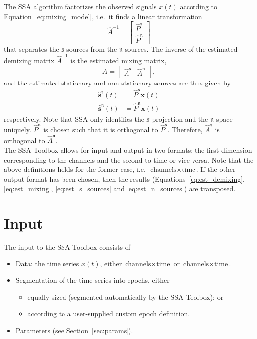 \documentclass{article}
\newcommand{\1}{\ensuremath{\mathds{1}}}
\newcommand{\s}{\ensuremath{\mathfrak{s}}}
\newcommand{\n}{\ensuremath{\mathfrak{n}}}
\newcommand{\0}{\ensuremath{0}}
\begin{document}
The SSA algorithm factorizes the observed signals $x(t)$ according to
Equation~\ref{eq:mixing_model}, i.e.~it finds a linear transformation
\begin{equation}
\label{eq:est_demixing}
  \hat{A}^{-1} = \begin{bmatrix} \hat{P}^{\s} \\ \hat{P}^{\n} \end{bmatrix}
\end{equation}
that separates the \s-sources from the \n-sources. The inverse of the estimated 
demixing matrix $\hat{A}^{-1}$ is the estimated mixing matrix, 
\begin{equation}
\label{eq:est_mixing}
 \hat{A} = \begin{bmatrix} \hat{A}^{\s} & \hat{A}^{\n} \end{bmatrix}, 
\end{equation}
and the estimated stationary and non-stationary sources are thus given by
\begin{align}
\label{eq:est_s_sources}
  \hat{\mathbf s}^{\s}(t) & = \hat{P}^{\s} {\mathbf x}(t) \\
\label{eq:est_n_sources}
  \hat{\mathbf s}^{\n}(t) & = \hat{P}^{\n} {\mathbf x}(t) 
\end{align}
respectively.
Note that SSA only identifies the $\s$-projection and the $\n$-space uniquely.
$\hat P^{\n}$ is chosen such that it is orthogonal to $\hat P^{\s}$.
Therefore, $\hat A^{\s}$ is orthogonal to $\hat A^{\n}$.\\
The SSA Toolbox allows for input and output in two formats: the first
dimension corresponding to the channels and the second to time or vice versa.  
Note that the above definitions holds for the former case, 
i.e.~$\text{channels} \times \text{time}$. If the other output format has
been chosen, then the results (Equations~\ref{eq:est_demixing}, \ref{eq:est_mixing}, 
\ref{eq:est_s_sources} and \ref{eq:est_n_sources}) are transposed.

\section{Input}

The input to the SSA Toolbox consists of
\begin{itemize}
 \item Data: the time series $x(t)$, either $\text{channels} \times \text{time}$ or 
				$\text{channels} \times \text{time}$.

 \item Segmentation of the time series into epochs, either
	\begin{itemize}
	  \item equally-sized (segmented automatically by the SSA Toolbox); or 
	  \item according to a user-supplied custom epoch definition. 
	\end{itemize}

 \item Parameters (see Section~\ref{sec:params}).
\end{itemize}
\end{document}
